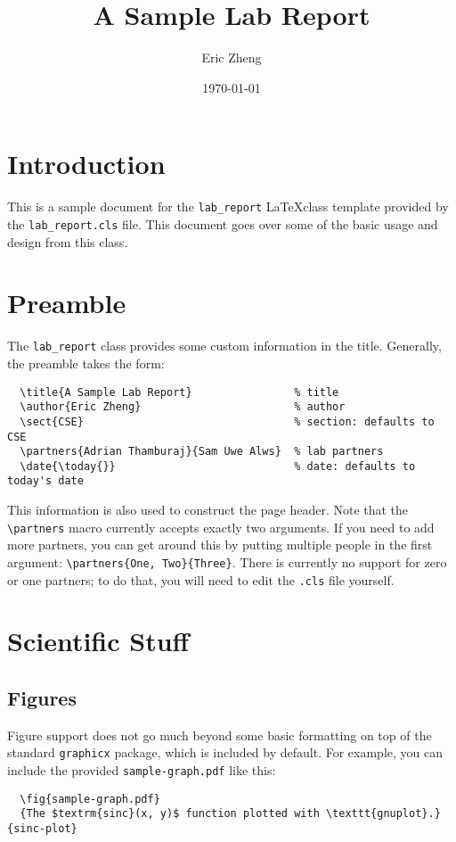 \documentclass{lab_report}
\title{A Sample Lab Report}
\author{Eric Zheng}
\date{\today{}}
\begin{document}
\maketitle
\section{Introduction}
This is a sample document for the \verb|lab_report| \LaTeX class template provided by the \verb|lab_report.cls| file. This document goes over some of the basic usage and design from this class.

\section{Preamble}
The \verb|lab_report| class provides some custom information in the title. Generally, the preamble takes the form:
\begin{verbatim}
  \title{A Sample Lab Report}                % title
  \author{Eric Zheng}                        % author
  \sect{CSE}                                 % section: defaults to CSE
  \partners{Adrian Thamburaj}{Sam Uwe Alws}  % lab partners
  \date{\today{}}                            % date: defaults to today's date
\end{verbatim}

This information is also used to construct the page header. Note that the \verb|\partners| macro currently accepts exactly two arguments. If you need to add more partners, you can get around this by putting multiple people in the first argument: \verb|\partners{One, Two}{Three}|. There is currently no support for zero or one partners; to do that, you will need to edit the \verb|.cls| file yourself.

\section{Scientific Stuff}
\subsection{Figures}
Figure support does not go much beyond some basic formatting on top of the standard \verb|graphicx| package, which is included by default. For example, you can include the provided \verb|sample-graph.pdf| like this:
\begin{verbatim}
  \fig{sample-graph.pdf}
  {The $textrm{sinc}(x, y)$ function plotted with \texttt{gnuplot}.}{sinc-plot}
\end{verbatim}
\end{document}

